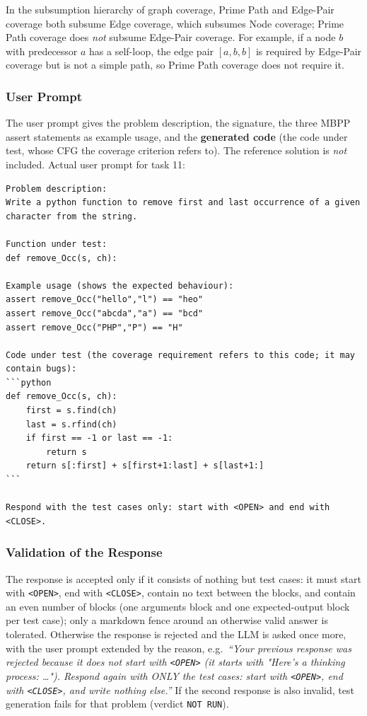 \documentclass[12pt, a4paper]{article}
\begin{document}
In the subsumption hierarchy of graph coverage, Prime Path and Edge-Pair coverage both subsume Edge coverage, which subsumes Node coverage; Prime Path coverage does \emph{not} subsume Edge-Pair coverage. For example, if a node $b$ with predecessor $a$ has a self-loop, the edge pair $[a, b, b]$ is required by Edge-Pair coverage but is not a simple path, so Prime Path coverage does not require it.

\subsubsection{User Prompt}

The user prompt gives the problem description, the signature, the three MBPP assert statements as example usage, and the \textbf{generated code} (the code under test, whose CFG the coverage criterion refers to). The reference solution is \emph{not} included. Actual user prompt for task 11:

\begin{lstlisting}[style=plain]
Problem description:
Write a python function to remove first and last occurrence of a given character from the string.

Function under test:
def remove_Occ(s, ch):

Example usage (shows the expected behaviour):
assert remove_Occ("hello","l") == "heo"
assert remove_Occ("abcda","a") == "bcd"
assert remove_Occ("PHP","P") == "H"

Code under test (the coverage requirement refers to this code; it may contain bugs):
```python
def remove_Occ(s, ch):
    first = s.find(ch)
    last = s.rfind(ch)
    if first == -1 or last == -1:
        return s
    return s[:first] + s[first+1:last] + s[last+1:]
```

Respond with the test cases only: start with <OPEN> and end with <CLOSE>.
\end{lstlisting}

\subsubsection{Validation of the Response}

The response is accepted only if it consists of nothing but test cases: it must start with \texttt{<OPEN>}, end with \texttt{<CLOSE>}, contain no text between the blocks, and contain an even number of blocks (one arguments block and one expected-output block per test case); only a markdown fence around an otherwise valid answer is tolerated. Otherwise the response is rejected and the LLM is asked once more, with the user prompt extended by the reason, e.g.\ \emph{``Your previous response was rejected because it does not start with \texttt{<OPEN>} (it starts with "Here's a thinking process: \ldots"). Respond again with ONLY the test cases: start with \texttt{<OPEN>}, end with \texttt{<CLOSE>}, and write nothing else.''} If the second response is also invalid, test generation fails for that problem (verdict \texttt{NOT RUN}).
\end{document}
